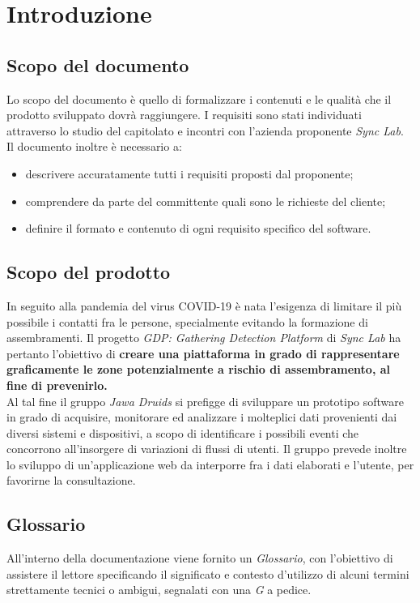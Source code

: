 \chapter{Introduzione}

\section{Scopo del documento}
Lo scopo del documento è quello di formalizzare i contenuti e le qualità che il prodotto sviluppato dovrà raggiungere. 
I requisiti sono stati individuati attraverso lo studio del capitolato e incontri con l'azienda proponente \textit{Sync Lab}. 
Il documento inoltre è necessario a:
\begin{itemize}
	\item descrivere accuratamente tutti i requisiti proposti dal proponente;
	\item comprendere da parte del committente quali sono le richieste del cliente;
	\item definire il formato e contenuto di ogni requisito specifico del software.
\end{itemize} 
\section{Scopo del prodotto}
In seguito alla pandemia del virus COVID-19 è nata l'esigenza di limitare il più possibile i contatti fra le persone, specialmente evitando la formazione di assembramenti. Il progetto \textit{GDP: Gathering Detection Platform} di \textit{Sync Lab} ha pertanto l'obiettivo di \textbf{creare una piattaforma in grado di rappresentare graficamente le zone potenzialmente a rischio di assembramento, al fine di prevenirlo.}
\\
Al tal fine il gruppo \textit{Jawa Druids} si prefigge di sviluppare un prototipo software in grado di acquisire, monitorare ed analizzare i molteplici dati provenienti dai diversi sistemi e dispositivi, a scopo di identificare i possibili eventi che concorrono all'insorgere di variazioni di flussi di utenti. Il gruppo prevede inoltre lo sviluppo di un'applicazione web da interporre fra i dati elaborati e l'utente, per favorirne la consultazione.
\section{Glossario}
All'interno della documentazione viene fornito un \textit{Glossario}, con l'obiettivo di assistere il lettore specificando il significato e contesto d'utilizzo di alcuni termini strettamente tecnici o ambigui, segnalati con una \textit{G} a pedice.

